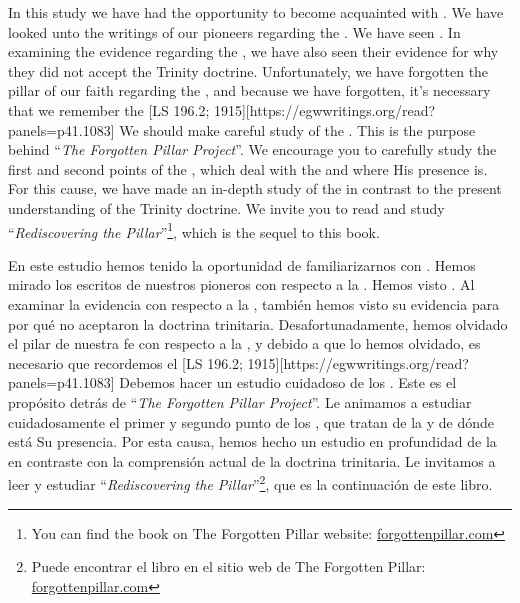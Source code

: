 In this study we have had the opportunity to become acquainted with . We have looked unto the writings of our pioneers regarding the . We have seen . In examining the evidence regarding the , we have also seen their evidence for why they did not accept the Trinity doctrine. Unfortunately, we have forgotten the pillar of our faith regarding the , and because we have forgotten, it’s necessary that we remember the [LS 196.2; 1915][https://egwwritings.org/read?panels=p41.1083] We should make careful study of the . This is the purpose behind “\textit{The Forgotten Pillar Project}”. We encourage you to carefully study the first and second points of the , which deal with the  and where His presence is. For this cause, we have made an in-depth study of the  in contrast to the present understanding of the Trinity doctrine. We invite you to read and study “\textit{Rediscovering the Pillar}”\footnote{You can find the book on The Forgotten Pillar website: \href{http://forgottenpillar.com}{forgottenpillar.com}}, which is the sequel to this book.


En este estudio hemos tenido la oportunidad de familiarizarnos con . Hemos mirado los escritos de nuestros pioneros con respecto a la . Hemos visto . Al examinar la evidencia con respecto a la , también hemos visto su evidencia para por qué no aceptaron la doctrina trinitaria. Desafortunadamente, hemos olvidado el pilar de nuestra fe con respecto a la , y debido a que lo hemos olvidado, es necesario que recordemos el [LS 196.2; 1915][https://egwwritings.org/read?panels=p41.1083] Debemos hacer un estudio cuidadoso de los . Este es el propósito detrás de “\textit{The Forgotten Pillar Project}”. Le animamos a estudiar cuidadosamente el primer y segundo punto de los , que tratan de la  y de dónde está Su presencia. Por esta causa, hemos hecho un estudio en profundidad de la  en contraste con la comprensión actual de la doctrina trinitaria. Le invitamos a leer y estudiar “\textit{Rediscovering the Pillar}”\footnote{Puede encontrar el libro en el sitio web de The Forgotten Pillar: \href{http://forgottenpillar.com}{forgottenpillar.com}}, que es la continuación de este libro.






